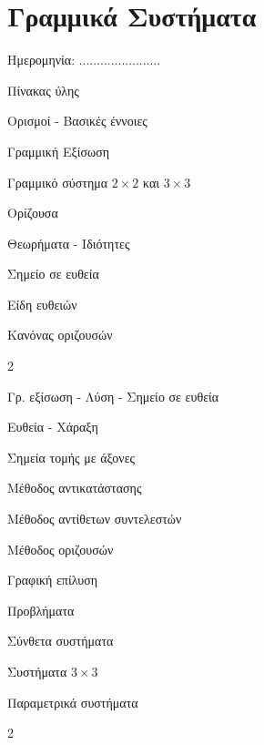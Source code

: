\documentclass[twoside,nofonts,internet,math,spyros]{frontisthrio}
\newcommand{\myitem}{\stepcounter{enumi}\item[\raisebox{0.5mm}{\faEdit}\ \Large$\square$]}
\begin{document}
\section{Γραμμικά Συστήματα}
\begin{flushright}
\faCalendar* Ημερομηνία: .......................
\end{flushright}
\begin{mybox}[mysubtitle]{Πίνακας ύλης}
\begin{tcbraster}[raster columns=2,raster equal height]
\begin{myleftbox}{Ορισμοί - Βασικές έννοιες\ \ \faBook}
\begin{arithmisi}
\item Γραμμική Εξίσωση
\item Γραμμικό σύστημα $ 2\times 2 $ και $ 3\times 3 $
\item Ορίζουσα
\end{arithmisi}
\end{myleftbox}
\begin{myrightbox}{Θεωρήματα - Ιδιότητες\ \ \faTools}
\begin{arithmisi}
\item Σημείο σε ευθεία
\item Είδη ευθειών
\item Κανόνας οριζουσών
\end{arithmisi}
\end{myrightbox}
\end{tcbraster}
\begin{multicols}{2}
\begin{todolist}[itemsep=0mm]
\item Γρ. εξίσωση - Λύση - Σημείο σε ευθεία
\item Ευθεία - Χάραξη
\item Σημεία τομής με άξονες
\myitem Μέθοδος αντικατάστασης
\myitem Μέθοδος αντίθετων συντελεστών
\myitem Μέθοδος οριζουσών
\item Γραφική επίλυση
\item Προβλήματα
\item Σύνθετα συστήματα
\item Συστήματα $ 3\times 3 $
\item Παραμετρικά συστήματα
\end{todolist}
\end{multicols}
\begin{multicols}{2}
\begin{enumerate}[itemsep=0mm]

\end{enumerate}
\end{multicols}
\end{mybox}
\end{document}
